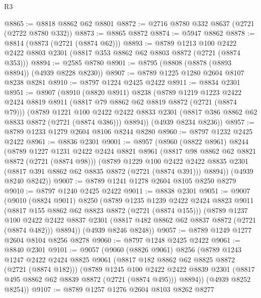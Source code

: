 \begin{lexlean}{R3}
\begin{coremodule}
@8865 := @8818 @8862 @62 @8801
@8872 := @2716 @8780 @332 @8637 (@2721 (@2722 @8780 @332))
@8873 := @8865 @8872
@8874 := @5947 @8862
@8878 := @8814 (@8873 (@2721 (@8874 @62)))
@8893 := @8789
    @1213
    @100
    @2422
    @2422
    @8803
    @2301
    (@8817 @353 @8862 @62 @8803 @8872 (@2721 (@8874 @353)))
@8894 := @2585 @8780
@8901 := @8795 (@8808 (@8878 (@8893 @8894)) (@4939 @8228 @8230))
@8907 := @8789 @1225 @1280 @2604 @8107 @8238 @8281
@8910 := @8797 @1224 @2425 @2422
@8911 := @8834 @2301
@8951 := @8907
    (@8910
      (@8820 @8911)
      @8238
      (@8789
        @1219
        @1223
        @2422
        @2424
        @8819
        @8911
        (@8817 @79 @8862 @62 @8819 @8872 (@2721 (@8874 @79)))
        (@8789
          @1221
          @100
          @2422
          @2422
          @8833
          @2301
          (@8817 @386 @8862 @62 @8833 @8872 (@2721 (@8874 @386)))
          @8894))
      (@4939 @8234 @8236))
@8957 := @8789 @1233 @1279 @2604 @8106 @8244 @8280
@8960 := @8797 @1232 @2425 @2422
@8961 := @8836 @2301
@9001 := @8957
    (@8960
      (@8822 @8961)
      @8244
      (@8789
        @1227
        @1231
        @2422
        @2424
        @8821
        @8961
        (@8817 @98 @8862 @62 @8821 @8872 (@2721 (@8874 @98)))
        (@8789
          @1229
          @100
          @2422
          @2422
          @8835
          @2301
          (@8817 @391 @8862 @62 @8835 @8872 (@2721 (@8874 @391)))
          @8894))
      (@4939 @8240 @8242))
@9007 := @8789 @1241 @1278 @2604 @8105 @8250 @8279
@9010 := @8797 @1240 @2425 @2422
@9011 := @8838 @2301
@9051 := @9007
    (@9010
      (@8824 @9011)
      @8250
      (@8789
        @1235
        @1239
        @2422
        @2424
        @8823
        @9011
        (@8817 @155 @8862 @62 @8823 @8872 (@2721 (@8874 @155)))
        (@8789
          @1237
          @100
          @2422
          @2422
          @8837
          @2301
          (@8817 @482 @8862 @62 @8837 @8872 (@2721 (@8874 @482)))
          @8894))
      (@4939 @8246 @8248))
@9057 := @8789 @1249 @1277 @2604 @8104 @8256 @8278
@9060 := @8797 @1248 @2425 @2422
@9061 := @8840 @2301
@9101 := @9057
    (@9060
      (@8826 @9061)
      @8256
      (@8789
        @1243
        @1247
        @2422
        @2424
        @8825
        @9061
        (@8817 @182 @8862 @62 @8825 @8872 (@2721 (@8874 @182)))
        (@8789
          @1245
          @100
          @2422
          @2422
          @8839
          @2301
          (@8817 @495 @8862 @62 @8839 @8872 (@2721 (@8874 @495)))
          @8894))
      (@4939 @8252 @8254))
@9107 := @8789 @1257 @1276 @2604 @8103 @8262 @8277

\end{coremodule}
\end{lexlean}
